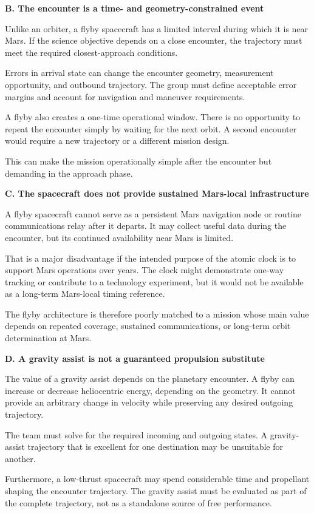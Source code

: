 \textbf{B. The encounter is a time- and geometry-constrained
	event}

Unlike an orbiter, a flyby spacecraft has a limited interval
during which it is near Mars. If the science objective depends
on a close encounter, the trajectory must meet the required
closest-approach conditions.

Errors in arrival state can change the encounter geometry,
measurement opportunity, and outbound trajectory. The group
must define acceptable error margins and account for navigation
and maneuver requirements.

A flyby also creates a one-time operational window. There is
no opportunity to repeat the encounter simply by waiting for
the next orbit. A second encounter would require a new trajectory
or a different mission design.

This can make the mission operationally simple after the
encounter but demanding in the approach phase.

\textbf{C. The spacecraft does not provide sustained
	Mars-local infrastructure}

A flyby spacecraft cannot serve as a persistent Mars navigation
node or routine communications relay after it departs. It may
collect useful data during the encounter, but its continued
availability near Mars is limited.

That is a major disadvantage if the intended purpose of the
atomic clock is to support Mars operations over years. The
clock might demonstrate one-way tracking or contribute to
a technology experiment, but it would not be available as
a long-term Mars-local timing reference.

The flyby architecture is therefore poorly matched to a mission
whose main value depends on repeated coverage, sustained
communications, or long-term orbit determination at Mars.

\textbf{D. A gravity assist is not a guaranteed propulsion
	substitute}

The value of a gravity assist depends on the planetary encounter.
A flyby can increase or decrease heliocentric energy, depending
on the geometry. It cannot provide an arbitrary change in
velocity while preserving any desired outgoing trajectory.

The team must solve for the required incoming and outgoing
states. A gravity-assist trajectory that is excellent for one
destination may be unsuitable for another.

Furthermore, a low-thrust spacecraft may spend considerable
time and propellant shaping the encounter trajectory. The
gravity assist must be evaluated as part of the complete
trajectory, not as a standalone source of free performance.

